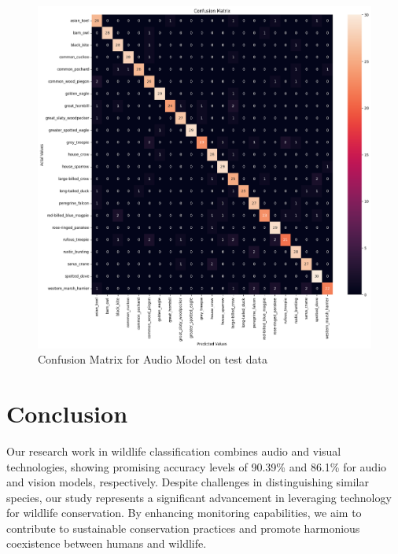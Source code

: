 \documentclass[fleqn, 10pt, twoside]{IOEGC}
\begin{document}
\begin{figure}[t] %
	\centering
	\begin{minipage}{\textwidth} %
		\includegraphics[scale=0.4]{Graphics/audio_cm.png} %
		\caption{Confusion Matrix for Audio Model on test data}
		\label{cm_audio}
	\end{minipage}
\end{figure}



\clearpage
\section{Conclusion}
Our research work in wildlife classification combines audio and visual technologies, showing promising accuracy levels of 90.39\% and 86.1\% for audio and vision models, respectively. Despite challenges in distinguishing similar species, our study represents a significant advancement in leveraging technology for wildlife conservation. By enhancing monitoring capabilities, we aim to contribute to sustainable conservation practices and promote harmonious coexistence between humans and wildlife.
\end{document}
